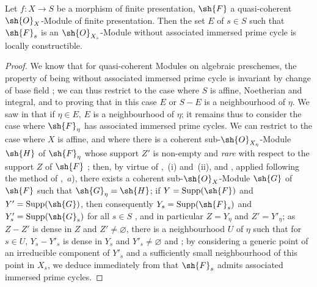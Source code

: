 \begin{proposition}[9.8.1]
\label{IV.9.8.1}
Let $f:X\to S$ be a morphism of finite presentation, $\sh{F}$ a quasi-coherent $\sh{O}_X$-Module of finite presentation.
Then the set $E$ of $s\in S$ such that $\sh{F}_s$ is an $\sh{O}_{X_s}$-Module without associated immersed prime cycle is locally constructible.
\end{proposition}

\begin{proof}
\label{IV.9.8.1-proof}
We know that for quasi-coherent Modules on algebraic preschemes, the property of being without associated immersed prime cycle is invariant by change of base field ; we can thus restrict to the case where $S$ is affine, Noetherian and integral, and to proving that in this case $E$ or $S-E$ is a neighbourhood of $\eta$.
We saw in  that if $\eta\in E$, $E$ is a neighbourhood of $\eta$; it remains thus to consider the case where $\sh{F}_\eta$ has associated immersed prime cycles.
We can restrict to the case where $X$ is affine, and where there is a coherent sub-$\sh{O}_{X_\eta}$-Module $\sh{H}$ of $\sh{F}_\eta$ whose support $Z'$ is non-empty and \emph{rare} with respect to the support $Z$ of $\sh{F}$ ; then, by virtue of ,~(i) and~(ii),
and , applied following the method of ,~$a$), there exists a coherent sub-$\sh{O}_X$-Module $\sh{G}$ of $\sh{F}$ such that $\sh{G}_\eta=\sh{H}$; if $Y=\operatorname{Supp}(\sh{F})$ and $Y'=\operatorname{Supp}(\sh{G})$, then consequently $Y_s=\operatorname{Supp}(\sh{F}_s)$ and $Y'_s=\operatorname{Supp}(\sh{G}_s)$ for all $s\in S$ , and in particular $Z=Y_\eta$ and $Z'=Y'_\eta$; as $Z-Z'$ is dense in $Z$ and $Z'\neq\varnothing$, there is a neighbourhood $U$ of $\eta$ such that for $s\in U$, $Y_s-Y'_s$ is dense in $Y_s$ and $Y'_s\neq\varnothing$  and ; by considering a generic point of an irreducible component of $Y'_s$ and a sufficiently small neighbourhood of this point in $X_s$, we deduce immediately from  that $\sh{F}_s$ admits associated immersed prime cycles.
\end{proof}

